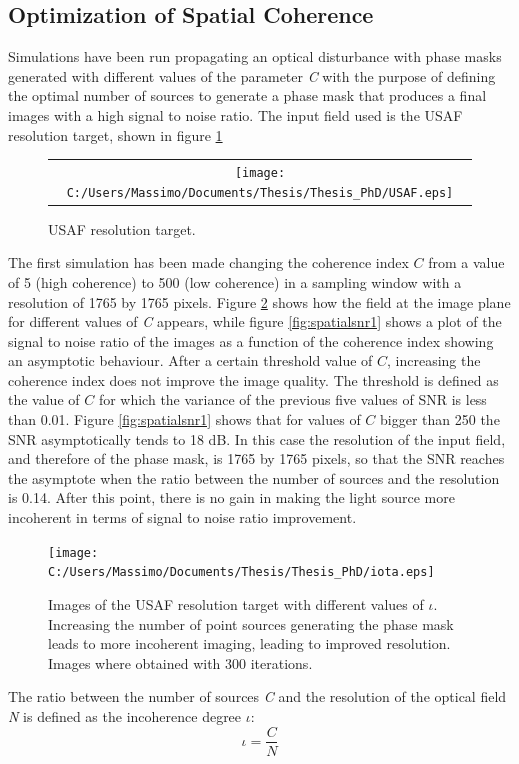  \subsection{Optimization of Spatial Coherence}
 Simulations have been run propagating an optical disturbance with phase masks generated with different values of the parameter \textit{C} with the purpose of defining the optimal number of sources to generate a phase mask that produces a final images with a high signal to noise ratio.
 The input field used is the USAF resolution target, shown in figure \ref{fig:USAF}
 \begin{figure}[H]
 	\begin{center}
 		\begin{tabular}{c}
 			\texttt{[image: C:/Users/Massimo/Documents/Thesis/Thesis\_PhD/USAF.eps]}
 		\end{tabular}
 	\end{center}
 	\caption{ \label{fig:USAF} 
 		USAF resolution target. }
 \end{figure} 
 The first simulation has been made changing the coherence index $C$ from a value of 5 (high coherence) to 500 (low coherence) in a sampling window with a resolution of 1765 by 1765 pixels.
 Figure \ref{fig:spatialsnr2} shows how the field at the image plane for different values of \textit{C} appears, while figure \ref{fig:spatialsnr1} shows a plot of the signal to noise ratio of the images as a function of the coherence index showing an asymptotic behaviour. After a certain threshold value of $C$, increasing the coherence index does not improve the image quality. The threshold is defined as the value of $C$ for which the variance of the previous five values of SNR is less than 0.01.
 Figure \ref{fig:spatialsnr1} shows that for values of $C$ bigger than 250 the SNR asymptotically tends to 18 dB. In this case the resolution of the input field, and therefore of the phase mask, is 1765 by 1765 pixels, so that the SNR reaches the asymptote when the ratio between the number of sources and the resolution is 0.14. After this point, there is no gain in making the light source more incoherent in terms of signal to noise ratio improvement.
 \begin{figure}[H]
 	\centering
 	\texttt{[image: C:/Users/Massimo/Documents/Thesis/Thesis\_PhD/iota.eps]}
 	\caption{\label{fig:spatialsnr2}Images of the USAF resolution target with different values of $\iota$. Increasing the number of point sources generating the phase mask leads to more incoherent imaging, leading to improved resolution. Images where obtained with 300 iterations.}
 \end{figure}
 The ratio between the number of sources \textit{C} and the resolution of the optical field \textit{N} is defined as the incoherence degree $\iota$:
 \begin{equation}
 \label{eq:incoherence_degree}
 \iota = \dfrac{C}{N}
 \end{equation}
 \newpage
 
